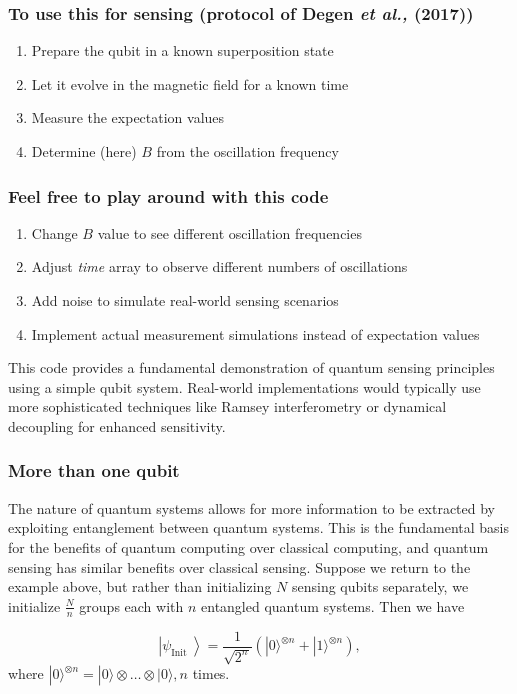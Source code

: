 \documentclass{beamer}
\begin{document}
\begin{frame}
\frametitle{To use this for sensing (protocol of Degen \emph{et al.,} (2017))}

\begin{enumerate}
\item Prepare the qubit in a known superposition state

\item Let it evolve in the magnetic field for a known time

\item Measure the expectation values

\item Determine (here) $B$ from the oscillation frequency
\end{enumerate}

\noindent
\end{frame}

\begin{frame}
\frametitle{Feel free to play around with this code}

\begin{enumerate}
\item Change $B$ value to see different oscillation frequencies

\item Adjust \emph{time} array to observe different numbers of oscillations

\item Add noise to simulate real-world sensing scenarios

\item Implement actual measurement simulations instead of expectation values
\end{enumerate}

\noindent
This code provides a fundamental demonstration of quantum sensing
principles using a simple qubit system. Real-world implementations
would typically use more sophisticated techniques like Ramsey
interferometry or dynamical decoupling for enhanced sensitivity.
\end{frame}

\begin{frame}
\frametitle{More than one qubit}

The nature of quantum systems allows for more information to be
extracted by exploiting entanglement between quantum systems. This is
the fundamental basis for the benefits of quantum computing over
classical computing, and quantum sensing has similar benefits over
classical sensing. Suppose we return to the example above, but rather
than initializing $N$ sensing qubits separately, we initialize
$\frac{N}{n}$ groups each with $n$ entangled quantum systems. Then we
have

\[
\left|\psi_{\text {Init }}\right\rangle=\frac{1}{\sqrt{2^{n}}}\left(|0\rangle^{\otimes n}+|1\rangle^{\otimes n}\right),
\]
where $|0\rangle^{\otimes n}=|0\rangle \otimes \ldots \otimes|0\rangle, n$ times.
\end{frame}
\end{document}
